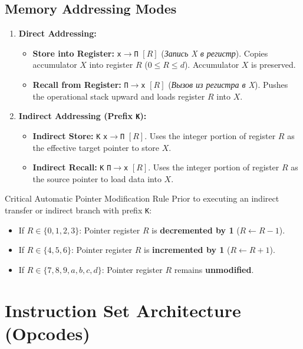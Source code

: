 \documentclass[11pt,a4paper]{article}
\begin{document}
\subsection{Memory Addressing Modes}
\begin{enumerate}
    \item \textbf{Direct Addressing:}
    \begin{itemize}
        \item \textbf{Store into Register:} \texttt{x$\to$П} $[R]$ (\textit{Запись X в регистр}). Copies accumulator $X$ into register $R$ ($0 \le R \le d$). Accumulator $X$ is preserved.
        \item \textbf{Recall from Register:} \texttt{П$\to$x} $[R]$ (\textit{Вызов из регистра в X}). Pushes the operational stack upward and loads register $R$ into $X$.
    \end{itemize}
    \item \textbf{Indirect Addressing (Prefix \texttt{K}):}
    \begin{itemize}
        \item \textbf{Indirect Store:} \texttt{K} \texttt{x$\to$П} $[R]$. Uses the integer portion of register $R$ as the effective target pointer to store $X$.
        \item \textbf{Indirect Recall:} \texttt{K} \texttt{П$\to$x} $[R]$. Uses the integer portion of register $R$ as the source pointer to load data into $X$.
    \end{itemize}
\end{enumerate}

\begin{techbox}{Critical Automatic Pointer Modification Rule}
Prior to executing an indirect transfer or indirect branch with prefix \texttt{K}:
\begin{itemize}
    \item If $R \in \{0, 1, 2, 3\}$: Pointer register $R$ is \textbf{decremented by 1} ($R \leftarrow R - 1$).
    \item If $R \in \{4, 5, 6\}$: Pointer register $R$ is \textbf{incremented by 1} ($R \leftarrow R + 1$).
    \item If $R \in \{7, 8, 9, a, b, c, d\}$: Pointer register $R$ remains \textbf{unmodified}.
\end{itemize}
\end{techbox}

\newpage

\section{Instruction Set Architecture (Opcodes)}
\end{document}
